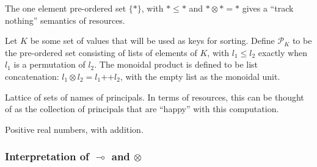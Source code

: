 

\begin{example}[Trivial]
  The one element pre-ordered set $\{*\}$, with $* \leq *$ and
  $* \otimes * = *$ gives a ``track nothing'' semantics of
  resources. 
\end{example}

\newcommand{\append}{\mathop{++}}

\begin{example}
  Let $K$ be some set of values that will be used as keys for
  sorting. Define $\mathcal{P}_K$ to be the pre-ordered set consisting
  of lists of elements of $K$, with $l_1 \leq l_2$ exactly when $l_1$
  is a permutation of $l_2$. The monoidal product is defined to be
  list concatenation: $l_1 \otimes l_2 = l_1 \append l_2$, with the
  empty list as the monoidal unit.


\end{example}

\begin{example}
  Lattice of sets of names of principals. In terms of resources, this
  can be thought of as the collection of principals that are ``happy''
  with this computation. 
\end{example}

\begin{example}[Distances]
  Positive real numbers, with addition.
\end{example}

\subsubsection{Interpretation of $\multimap$ and $\otimes$}

